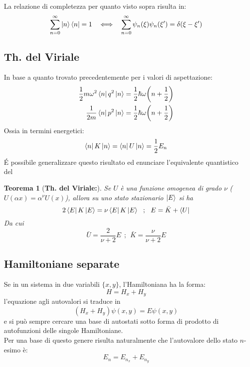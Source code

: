 \documentclass[twoside]{article}
\newtheorem{theorem}{Teorema}[section]
\begin{document}
La relazione di completezza per quanto visto sopra risulta in:
\begin{equation}
    \displaystyle\sum_{n=0}^{\infty}\ket{n}\bra{n}=1 \ \ \iff \ \ \displaystyle\sum_{n=0}^{\infty} \psi_n(\xi)\psi_n(\xi')=\delta(\xi-\xi')
\end{equation}

\vspace{0.5cm}

\subsection{Th. del Viriale}
 In base a quanto trovato precedentemente per i valori di aspettazione:
 \begin{equation}
     \begin{split}
         \frac{1}{2}m\omega^2\bra{n}q^2\ket{n}=\frac{1}{2}\hbar\omega\biggl(n+\frac{1}{2}\biggr) \\
         \frac{1}{2m}\bra{n}p^2\ket{n}=\frac{1}{2}\hbar\omega\biggl(n+\frac{1}{2}\biggr)
     \end{split}
 \end{equation}
Ossia in termini energetici:
\begin{equation}
    \bra{n}K\ket{n}=\bra{n}U\ket{n}=\frac{1}{2}E_n
\end{equation}
\'E possibile generalizzare questo risultato ed enunciare l'equivalente quantistico del

\begin{theorem}[\textbf{Th. del Viriale:}]
Se $U$ è una funzione omogenea di grado $\nu$ ($U(\alpha x)=\alpha^{\nu}U(x)$), allora su uno stato stazionario $\ket{E}$ si ha
\begin{equation}
    2\bra{E}K\ket{E}=\nu\bra{E}K\ket{E} \ \ ; \ \ E=\bar{K}+\bra{U}
\end{equation}
Da cui
\begin{equation}
    \bar{U}=\frac{2}{\nu +2}E \ \ ; \ \ \bar{K}=\frac{\nu}{\nu +2}E
\end{equation}
\end{theorem}

\vspace{0.5cm}

\subsection{Hamiltoniane separate}
Se in un sistema in due variabili $\{x,y\}$, l'Hamiltoniana ha la forma:
\begin{equation}
    H=H_x+H_y
\end{equation}
l'equazione agli autovalori si traduce in
\begin{equation}
    (H_x+H_y)\psi(x,y)=E\psi(x,y)
\end{equation}
e si può sempre cercare una base di autostati sotto forma di prodotto di autofunzioni delle singole Hamiltoniane.
\\
Per una base di questo genere risulta naturalmente che l'autovalore dello stato $n$-esimo è:
\begin{equation}
    E_n=E_{n_x}+E_{n_y}
\end{equation}
\end{document}
